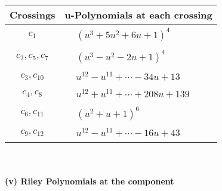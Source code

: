 \documentclass[1p]{elsarticle_modified}
\theoremstyle{definition}
\begin{document}
\begin{tabular}{m{50pt}|m{274pt}}
Crossings & \hspace{64pt}u-Polynomials at each crossing \\
\hline $$\begin{aligned}c_{1}\end{aligned}$$&$\begin{aligned}
&(u^3+5 u^2+6 u+1)^4
\end{aligned}$\\
\hline $$\begin{aligned}c_{2},c_{5},c_{7}\end{aligned}$$&$\begin{aligned}
&(u^3- u^2-2 u+1)^4
\end{aligned}$\\
\hline $$\begin{aligned}c_{3},c_{10}\end{aligned}$$&$\begin{aligned}
&u^{12}- u^{11}+\cdots-34 u+13
\end{aligned}$\\
\hline $$\begin{aligned}c_{4},c_{8}\end{aligned}$$&$\begin{aligned}
&u^{12}+u^{11}+\cdots+208 u+139
\end{aligned}$\\
\hline $$\begin{aligned}c_{6},c_{11}\end{aligned}$$&$\begin{aligned}
&(u^2+u+1)^6
\end{aligned}$\\
\hline $$\begin{aligned}c_{9},c_{12}\end{aligned}$$&$\begin{aligned}
&u^{12}- u^{11}+\cdots-16 u+43
\end{aligned}$\\
\hline
\end{tabular}\\~\\
\newpage\renewcommand{\arraystretch}{1}
\flushleft \textbf{(v) Riley Polynomials at the component}\newline \\
\end{document}
